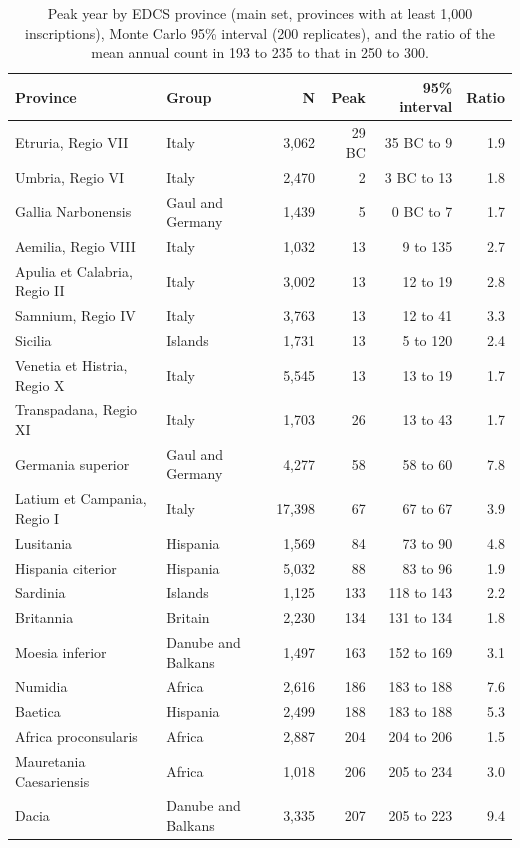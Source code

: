 \documentclass[11pt,a4paper]{article}
\begin{document}
\begin{table}[tbp]\centering\footnotesize\caption{Peak year by EDCS province (main set, provinces with at least 1,000 inscriptions), Monte Carlo 95\% interval (200 replicates), and the ratio of the mean annual count in 193 to 235 to that in 250 to 300.}\label{tab:peaks}\begin{tabular}{llrrrr}\toprule Province & Group & N & Peak & 95\% interval & Ratio\\\midrule
Etruria, Regio VII & Italy & 3,062 & 29 BC & 35 BC to 9 & 1.9\\
Umbria, Regio VI & Italy & 2,470 & 2 & 3 BC to 13 & 1.8\\
Gallia Narbonensis & Gaul and Germany & 1,439 & 5 & 0 BC to 7 & 1.7\\
Aemilia, Regio VIII & Italy & 1,032 & 13 & 9 to 135 & 2.7\\
Apulia et Calabria, Regio II & Italy & 3,002 & 13 & 12 to 19 & 2.8\\
Samnium, Regio IV & Italy & 3,763 & 13 & 12 to 41 & 3.3\\
Sicilia & Islands & 1,731 & 13 & 5 to 120 & 2.4\\
Venetia et Histria, Regio X & Italy & 5,545 & 13 & 13 to 19 & 1.7\\
Transpadana, Regio XI & Italy & 1,703 & 26 & 13 to 43 & 1.7\\
Germania superior & Gaul and Germany & 4,277 & 58 & 58 to 60 & 7.8\\
Latium et Campania, Regio I & Italy & 17,398 & 67 & 67 to 67 & 3.9\\
Lusitania & Hispania & 1,569 & 84 & 73 to 90 & 4.8\\
Hispania citerior & Hispania & 5,032 & 88 & 83 to 96 & 1.9\\
Sardinia & Islands & 1,125 & 133 & 118 to 143 & 2.2\\
Britannia & Britain & 2,230 & 134 & 131 to 134 & 1.8\\
Moesia inferior & Danube and Balkans & 1,497 & 163 & 152 to 169 & 3.1\\
Numidia & Africa & 2,616 & 186 & 183 to 188 & 7.6\\
Baetica & Hispania & 2,499 & 188 & 183 to 188 & 5.3\\
Africa proconsularis & Africa & 2,887 & 204 & 204 to 206 & 1.5\\
Mauretania Caesariensis & Africa & 1,018 & 206 & 205 to 234 & 3.0\\
Dacia & Danube and Balkans & 3,335 & 207 & 205 to 223 & 9.4\\

\end{tabular}
\end{table}
\end{document}

